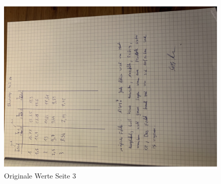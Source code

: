 \begin{figure}
  \centering
  \includegraphics[width = 15cm]{V105foto3.pdf}
  \caption{Originale Werte Seite 3}
\end{figure}



